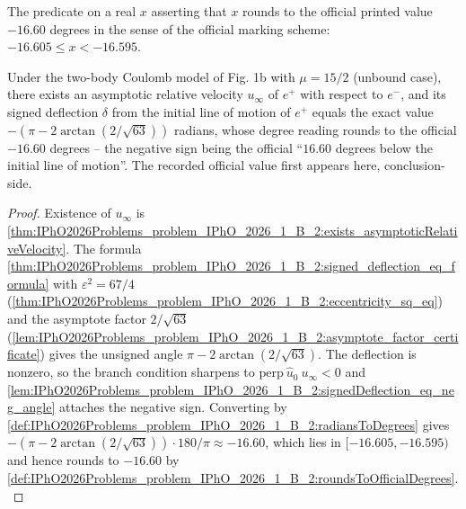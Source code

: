 \begin{definition}
\label{def:IPhO2026Problems_problem_IPhO_2026_1_B_2:roundsToOfficialDegrees}
The predicate on a real $x$ asserting that $x$ rounds to the official
printed value $-16.60$ degrees in the sense of the official marking scheme:
$-16.605 \le x < -16.595$.
\end{definition}

\begin{theorem}
\label{thm:IPhO2026Problems_problem_IPhO_2026_1_B_2:signed_deflection_angle_T1_B2}
Under the two-body Coulomb model of Fig. 1b with $\mu = 15/2$ (unbound
case), there exists an asymptotic relative velocity $u_\infty$ of $e^+$
with respect to $e^-$, and its signed deflection $\delta$ from the initial
line of motion of $e^+$ equals the exact value
$-(\pi - 2\arctan(2/\sqrt{63}))$ radians, whose degree reading rounds to
the official $-16.60$ degrees -- the negative sign being the official
``$16.60$ degrees below the initial line of motion''.  The recorded
official value first appears here, conclusion-side.
\end{theorem}
\begin{proof}
Existence of $u_\infty$ is
\cref{thm:IPhO2026Problems_problem_IPhO_2026_1_B_2:exists_asymptoticRelativeVelocity}.
The formula
\cref{thm:IPhO2026Problems_problem_IPhO_2026_1_B_2:signed_deflection_eq_formula}
with $\varepsilon^2 = 67/4$
(\cref{thm:IPhO2026Problems_problem_IPhO_2026_1_B_2:eccentricity_sq_eq})
and the asymptote factor $2/\sqrt{63}$
(\cref{lem:IPhO2026Problems_problem_IPhO_2026_1_B_2:asymptote_factor_certificate})
gives the unsigned angle $\pi - 2\arctan(2/\sqrt{63})$.  The deflection is
nonzero, so the branch condition sharpens to
$\mathrm{perp}\ \hat u_0\ u_\infty < 0$ and
\cref{lem:IPhO2026Problems_problem_IPhO_2026_1_B_2:signedDeflection_eq_neg_angle}
attaches the negative sign.  Converting by
\cref{def:IPhO2026Problems_problem_IPhO_2026_1_B_2:radiansToDegrees} gives
$-(\pi - 2\arctan(2/\sqrt{63})) \cdot 180/\pi \approx -16.60$, which lies
in $[-16.605, -16.595)$ and hence rounds to $-16.60$ by
\cref{def:IPhO2026Problems_problem_IPhO_2026_1_B_2:roundsToOfficialDegrees}.
\end{proof}

